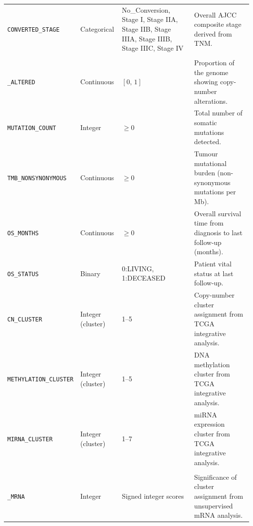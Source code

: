 {\begin{table}[p]
{\begin{tabular}{p{3.8cm} p{2.0cm} p{3.5cm} p{4.5cm}}
    \texttt{CONVERTED\_STAGE}
        & Categorical
        & No\_Conversion, Stage I, Stage IIA, Stage IIB, Stage IIIA, Stage IIIB, Stage IIIC, Stage IV
        & Overall AJCC composite stage derived from TNM. \\

    \makecell[l]{\texttt{FRACTION\_GENOME}\\\texttt{\_ALTERED}}
        & Continuous
        & $[0,\,1]$
        & Proportion of the genome showing copy-number alterations. \\

    \texttt{MUTATION\_COUNT}
        & Integer
        & $\geq 0$
        & Total number of somatic mutations detected. \\

    \texttt{TMB\_NONSYNONYMOUS}
        & Continuous
        & $\geq 0$
        & Tumour mutational burden (non-synonymous mutations per Mb). \\

    \texttt{OS\_MONTHS}
        & Continuous
        & $\geq 0$
        & Overall survival time from diagnosis to last follow-up (months). \\

    \texttt{OS\_STATUS}
        & Binary
        & 0:LIVING, 1:DECEASED
        & Patient vital status at last follow-up. \\

    \texttt{CN\_CLUSTER}
        & Integer (cluster)
        & 1--5
        & Copy-number cluster assignment from TCGA integrative analysis. \\

    \texttt{METHYLATION\_CLUSTER}
        & Integer (cluster)
        & 1--5
        & DNA methylation cluster from TCGA integrative analysis. \\

    \texttt{MIRNA\_CLUSTER}
        & Integer (cluster)
        & 1--7
        & miRNA expression cluster from TCGA integrative analysis. \\
    
        
    \makecell[l]{\texttt{SIGCLUST\_UNSUPERVISED}\\\texttt{\_MRNA}}
        & Integer
        & Signed integer scores
        & Significance of cluster assignment from unsupervised mRNA analysis. \\
    \hline
    \end{tabular}
    }
    \end{table}
}

